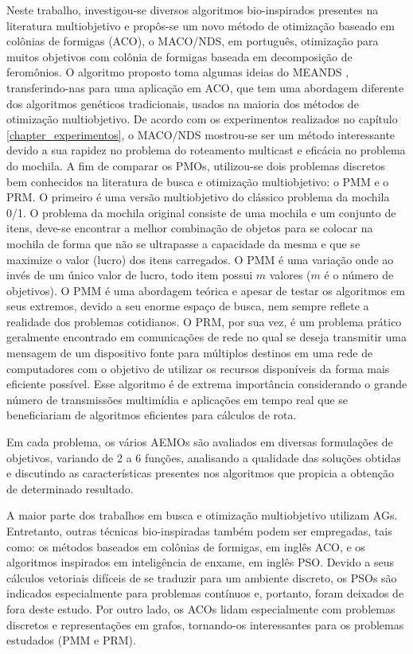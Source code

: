 Neste trabalho, investigou-se diversos algoritmos bio-inspirados presentes na literatura multiobjetivo e propôs-se um novo método de otimização baseado em colônias de formigas (ACO), o \ac{MACO/NDS}, em português, otimização para muitos objetivos com colônia de formigas baseada em decomposição de feromônios. O algoritmo proposto toma algumas ideias do MEANDS \cite{Lafeta2017}, transferindo-nas para uma aplicação em ACO, que tem uma abordagem diferente dos algoritmos genéticos tradicionais, usados na maioria dos métodos de otimização multiobjetivo. De acordo com os experimentos realizados no capítulo \ref{chapter_experimentos}, o MACO/NDS mostrou-se ser um método interessante devido a sua rapidez no problema do roteamento multicast e eficácia no problema do mochila. A fim de comparar os \acp{PMO}, utilizou-se dois problemas discretos bem conhecidos na literatura de busca e otimização multiobjetivo: o \ac{PMM} e o \ac{PRM}. O primeiro é uma versão multiobjetivo do clássico problema da mochila 0/1. O problema da mochila original consiste de uma mochila e um conjunto de itens, deve-se encontrar a melhor combinação de objetos para se colocar na mochila de forma que não se ultrapasse a capacidade da mesma e que se maximize o valor (lucro) dos itens carregados. O PMM é uma variação onde ao invés de um único valor de lucro, todo item possui $m$ valores ($m$ é o número de objetivos). O \ac{PMM} é uma abordagem teórica e apesar de testar os algoritmos em seus extremos, devido a seu enorme espaço de busca, nem sempre reflete a realidade dos problemas cotidianos. O \ac{PRM}, por sua vez, é um problema prático geralmente encontrado em comunicações de rede no qual se deseja transmitir uma mensagem de um dispositivo fonte para múltiplos destinos em uma rede de computadores com o objetivo de utilizar os recursos disponíveis da forma mais eficiente possível. Esse algoritmo é de extrema importância considerando o grande número de transmissões multimídia e aplicações em tempo real que se beneficiariam de algoritmos eficientes para cálculos de rota.

Em cada problema, os vários AEMOs são avaliados em diversas formulações de objetivos, variando de 2 a 6 funções, analisando a qualidade das soluções obtidas e discutindo as características presentes nos algoritmos que propicia a obtenção de determinado resultado. 

A maior parte dos trabalhos em busca e otimização multiobjetivo utilizam \acp{AG}. Entretanto, outras técnicas bio-inspiradas também podem ser empregadas, tais como: os métodos baseados em colônias de formigas, em inglês \ac{ACO}, e os algoritmos inspirados em inteligência de enxame, em inglês \ac{PSO}. Devido a seus cálculos vetoriais difíceis de se traduzir para um ambiente discreto, os \acp{PSO} são indicados especialmente para problemas contínuos e, portanto, foram deixados de fora deste estudo. Por outro lado, os \acp{ACO} lidam especialmente com problemas discretos e representações em grafos, tornando-os interessantes para os problemas estudados (PMM e PRM). 

